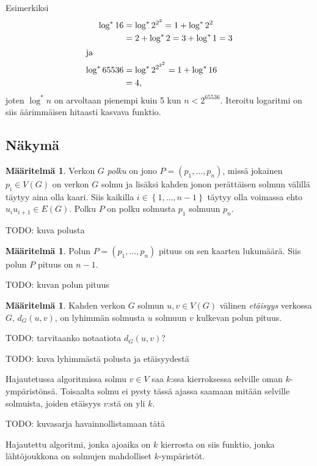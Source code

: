 \documentclass[finnish]{tktltiki2}
\theoremstyle{definition}
\newtheorem{maar}[lau]{Määritelmä}
\theoremstyle{remark}
\newcommand{\set}[1]{\left\{ #1 \right\}}
\begin{document}
Esimerkiksi
%
\begin{align*}
    \log^* 16 &= \log^* 2^{2^2} = 1 + \log^* 2^2 \\
              &= 2+ \log^* 2 = 3 + \log^* 1 = 3 \\
\intertext{ja}
    \log^* 65536 &= \log^* 2^{2^{2^2}} = 1 + \log^* 16 \\
                 &= 4,
\end{align*}
%
joten $\log^* n$ on arvoltaan pienempi kuin 5 kun $n < 2^{65536}$. Iteroitu
logaritmi on siis äärimmäisen hitaasti kasvava funktio.

\subsection{Näkymä}

\begin{maar}
    Verkon $G$ \emph{polku} on jono $P = (p_1, \dots, p_n)$, missä jokainen
    $p_i \in V(G)$ on verkon $G$ solmu ja lisäksi kahden jonon perättäisen
    solmun välillä täytyy aina olla kaari. Siis kaikilla $i \in \set{1, \dots,
        n-1}$ täytyy olla voimassa ehto $u_i u_{i+1} \in E(G)$. Polku $P$ on
    polku solmusta $p_1$ solmuun $p_n$.
\end{maar}

TODO: kuva polusta

\begin{maar}
    Polun $P = (p_1, \dots, p_n)$ pituus on sen kaarten lukumäärä. Siis polun
    $P$ pituus on $n-1$.
\end{maar}

TODO: kuvan polun pituus

\begin{maar}
    Kahden verkon $G$ solmun $u,v \in V(G)$ välinen \emph{etäisyys} verkossa
    $G$, $d_G(u,v)$, on lyhimmän solmusta $u$ solmuun $v$ kulkevan polun pituus.
\end{maar}

TODO: tarvitaanko notaatiota $d_G(u,v)$?

TODO: kuva lyhimmästä polusta ja etäisyydestä

Hajautetussa algoritmissa solmu $v \in V$ saa $k$:ssa kierroksessa selville
oman $k$-ympäristönsä. Toisaalta solmu ei pysty tässä ajassa saamaan mitään
selville solmuista, joiden etäisyys $v$:stä on yli $k$.

TODO: kuvasarja havainnollistamaan tätä

Hajautettu algoritmi, jonka ajoaika on $k$ kierrosta on siis funktio, jonka
lähtöjoukkona on solmujen mahdolliset $k$-ympäristöt.
\end{document}
